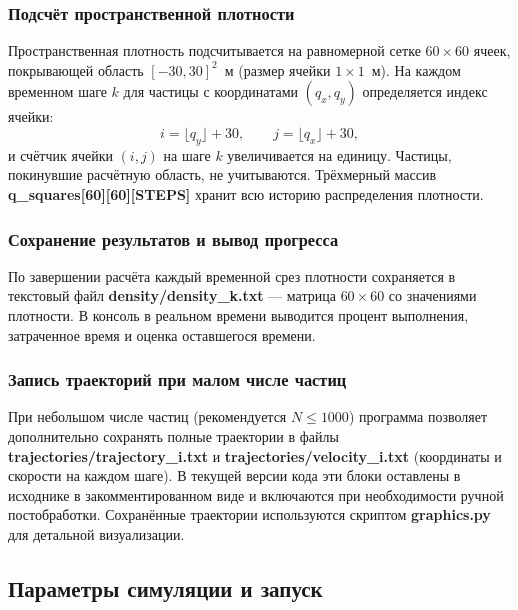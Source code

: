 \documentclass[14pt,a4paper]{extarticle}
\numberwithin{figure}{section}
\numberwithin{table}{section}
\begin{document}
\subsubsection{Подсчёт пространственной плотности}

Пространственная плотность подсчитывается на равномерной сетке $60 \times 60$ ячеек,
покрывающей область $[-30, 30]^2$~м (размер ячейки $1 \times 1$~м).
На каждом временном шаге $k$ для частицы с координатами $(q_x, q_y)$
определяется индекс ячейки:
\begin{equation}
    i = \lfloor q_y \rfloor + 30, \qquad j = \lfloor q_x \rfloor + 30,
\end{equation}
и счётчик ячейки $(i, j)$ на шаге $k$ увеличивается на единицу.
Частицы, покинувшие расчётную область, не учитываются.
Трёхмерный массив \linebreak \textbf{q\_squares[60][60][STEPS]} хранит
всю историю распределения плотности.

\subsubsection{Сохранение результатов и вывод прогресса}

По завершении расчёта каждый временной срез плотности сохраняется
в текстовый файл \textbf{density/density\_k.txt} ---
матрица $60 \times 60$ со значениями плотности. В консоль в реальном
времени выводится процент выполнения, затраченное время и оценка
оставшегося времени.

\subsubsection{Запись траекторий при малом числе частиц}

При небольшом числе частиц (рекомендуется $N \leq 1000$) программа позволяет
дополнительно сохранять полные траектории в файлы \linebreak
\textbf{trajectories/trajectory\_i.txt} и \textbf{trajectories/velocity\_i.txt}
(координаты и скорости на каждом шаге). В текущей версии кода эти блоки оставлены
в исходнике в закомментированном виде и включаются при необходимости ручной
постобработки. Сохранённые траектории используются скриптом \textbf{graphics.py}
для детальной визуализации.

\subsection{Параметры симуляции и запуск}
\end{document}
